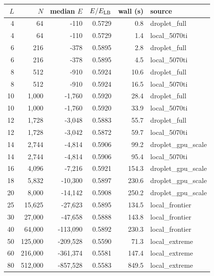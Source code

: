 \begin{tabular}{rrrrrl}
\toprule
$L$ & $N$ & median $E$ & $E/E_{\rm LB}$ & wall (s) & source \\
\midrule
4 & 64 & -110 & 0.5729 & 0.8 & droplet_full \\
4 & 64 & -110 & 0.5729 & 1.4 & local_5070ti \\
6 & 216 & -378 & 0.5895 & 2.8 & droplet_full \\
6 & 216 & -378 & 0.5895 & 4.5 & local_5070ti \\
8 & 512 & -910 & 0.5924 & 10.6 & droplet_full \\
8 & 512 & -910 & 0.5924 & 16.5 & local_5070ti \\
10 & 1,000 & -1,760 & 0.5920 & 28.4 & droplet_full \\
10 & 1,000 & -1,760 & 0.5920 & 33.9 & local_5070ti \\
12 & 1,728 & -3,048 & 0.5883 & 55.7 & droplet_full \\
12 & 1,728 & -3,042 & 0.5872 & 59.7 & local_5070ti \\
14 & 2,744 & -4,814 & 0.5906 & 99.2 & droplet_gpu_scale \\
14 & 2,744 & -4,814 & 0.5906 & 95.4 & local_5070ti \\
16 & 4,096 & -7,216 & 0.5921 & 154.3 & droplet_gpu_scale \\
18 & 5,832 & -10,300 & 0.5897 & 230.6 & droplet_gpu_scale \\
20 & 8,000 & -14,142 & 0.5908 & 250.2 & droplet_gpu_scale \\
25 & 15,625 & -27,623 & 0.5895 & 134.5 & local_frontier \\
30 & 27,000 & -47,658 & 0.5888 & 143.8 & local_frontier \\
40 & 64,000 & -113,090 & 0.5892 & 230.3 & local_frontier \\
50 & 125,000 & -209,528 & 0.5590 & 71.3 & local_extreme \\
60 & 216,000 & -361,374 & 0.5581 & 147.4 & local_extreme \\
80 & 512,000 & -857,528 & 0.5583 & 849.5 & local_extreme \\
\bottomrule
\end{tabular}
